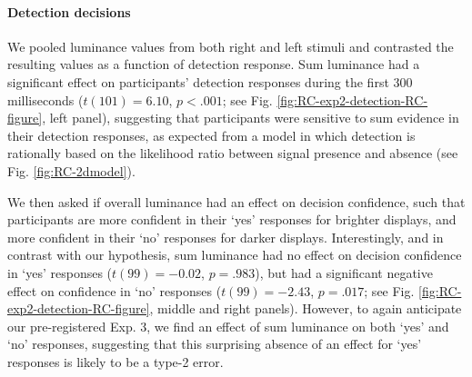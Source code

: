 \documentclass[12pt,twoside]{reedthesis}
\begin{document}
\hypertarget{e2-det-RC}{%
\paragraph{Detection decisions}\label{e2-det-RC}}

We pooled luminance values from both right and left stimuli and contrasted the resulting values as a function of detection response. Sum luminance had a significant effect on participants' detection responses during the first 300 milliseconds (\(t(101) = 6.10\), \(p < .001\); see Fig. \ref{fig:RC-exp2-detection-RC-figure}, left panel), suggesting that participants were sensitive to sum evidence in their detection responses, as expected from a model in which detection is rationally based on the likelihood ratio between signal presence and absence (see Fig. \ref{fig:RC-2dmodel}).

We then asked if overall luminance had an effect on decision confidence, such that participants are more confident in their `yes' responses for brighter displays, and more confident in their `no' responses for darker displays. Interestingly, and in contrast with our hypothesis, sum luminance had no effect on decision confidence in `yes' responses (\(t(99) = -0.02\), \(p = .983\)), but had a significant negative effect on confidence in `no' responses (\(t(99) = -2.43\), \(p = .017\); see Fig. \ref{fig:RC-exp2-detection-RC-figure}, middle and right panels). However, to again anticipate our pre-registered Exp. 3, we find an effect of sum luminance on both `yes' and `no' responses, suggesting that this surprising absence of an effect for `yes' responses is likely to be a type-2 error.
\end{document}
